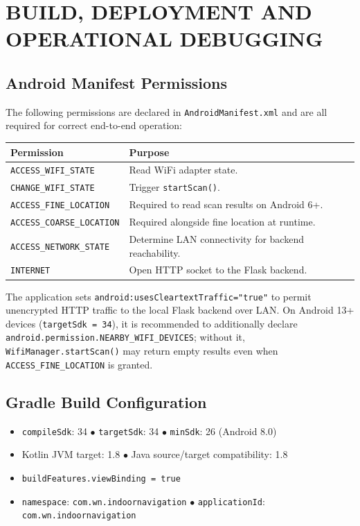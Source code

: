 \documentclass[11pt,a4paper]{article}
\begin{document}
\section{BUILD, DEPLOYMENT AND OPERATIONAL DEBUGGING}
\subsection{Android Manifest Permissions}
The following permissions are declared in \texttt{AndroidManifest.xml} and are all required for correct end-to-end operation:
\begin{center}
\renewcommand{\arraystretch}{1.2}
\begin{tabular}{@{}ll@{}}
\toprule
\textbf{Permission} & \textbf{Purpose} \\ \midrule
\texttt{ACCESS\_WIFI\_STATE}      & Read WiFi adapter state. \\
\texttt{CHANGE\_WIFI\_STATE}      & Trigger \texttt{startScan()}. \\
\texttt{ACCESS\_FINE\_LOCATION}   & Required to read scan results on Android 6+. \\
\texttt{ACCESS\_COARSE\_LOCATION} & Required alongside fine location at runtime. \\
\texttt{ACCESS\_NETWORK\_STATE}   & Determine LAN connectivity for backend reachability. \\
\texttt{INTERNET}                 & Open HTTP socket to the Flask backend. \\
\bottomrule
\end{tabular}
\end{center}
The application sets \texttt{android:usesCleartextTraffic="true"} to permit unencrypted HTTP traffic to the local Flask backend over LAN. On Android 13+ devices (\texttt{targetSdk = 34}), it is recommended to additionally declare \texttt{android.permission.NEARBY\_WIFI\_DEVICES}; without it, \texttt{WifiManager.startScan()} may return empty results even when \texttt{ACCESS\_FINE\_LOCATION} is granted.
\subsection{Gradle Build Configuration}
\begin{itemize}
\item \texttt{compileSdk}: 34 \quad $\bullet$ \quad \texttt{targetSdk}: 34 \quad $\bullet$ \quad \texttt{minSdk}: 26 (Android 8.0)
\item Kotlin JVM target: 1.8 \quad $\bullet$ \quad Java source/target compatibility: 1.8
\item \texttt{buildFeatures.viewBinding = true}
\item \texttt{namespace}: \texttt{com.wn.indoornavigation} \quad $\bullet$ \quad \texttt{applicationId}: \texttt{com.wn.indoornavigation}
\end{itemize}
\end{document}
